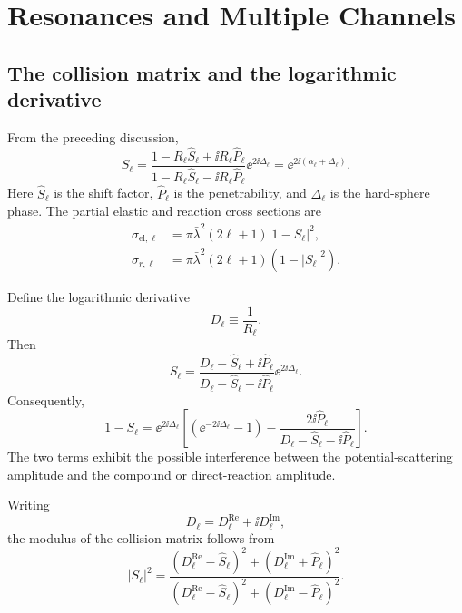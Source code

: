 \chapter{Resonances and Multiple Channels}


\section{The collision matrix and the logarithmic derivative}
From the preceding discussion,
\begin{equation}
  S_\ell
  =\frac{1-R_\ell\widehat S_\ell+\ii R_\ell\widehat P_\ell}
         {1-R_\ell\widehat S_\ell-\ii R_\ell\widehat P_\ell}
   \ee^{2\ii\Delta_\ell}
  =\ee^{2\ii(\alpha_\ell+\Delta_\ell)}.
  \label{eq:res-S-R}
\end{equation}
Here $\widehat S_\ell$ is the shift factor, $\widehat P_\ell$ is the penetrability, and $\Delta_\ell$ is the hard-sphere phase.  The partial elastic and reaction cross sections are
\begin{align}
  \sigma_{\mathrm{el},\ell}
  &=\pi\bar\lambda^2(2\ell+1)|1-S_\ell|^2,
  \label{eq:res-elastic-partial}\\
  \sigma_{r,\ell}
  &=\pi\bar\lambda^2(2\ell+1)(1-|S_\ell|^2).
  \label{eq:res-reaction-partial}
\end{align}

Define the logarithmic derivative
\[
  D_\ell\equiv\frac{1}{R_\ell}.
\]
Then
\begin{equation}
  S_\ell
  =\frac{D_\ell-\widehat S_\ell+\ii\widehat P_\ell}
         {D_\ell-\widehat S_\ell-\ii\widehat P_\ell}
   \ee^{2\ii\Delta_\ell}.
  \label{eq:res-S-D}
\end{equation}
Consequently,
\begin{equation}
  1-S_\ell
  =\ee^{2\ii\Delta_\ell}
  \left[
    \left(\ee^{-2\ii\Delta_\ell}-1\right)
    -\frac{2\ii\widehat P_\ell}
    {D_\ell-\widehat S_\ell-\ii\widehat P_\ell}
  \right].
  \label{eq:res-amplitude-split}
\end{equation}
The two terms exhibit the possible interference between the potential-scattering amplitude and the compound or direct-reaction amplitude.

Writing
\[
  D_\ell=D_\ell^{\mathrm{Re}}+\ii D_\ell^{\mathrm{Im}},
\]
the modulus of the collision matrix follows from
\begin{equation}
  |S_\ell|^2
  =\frac{(D_\ell^{\mathrm{Re}}-\widehat S_\ell)^2
          +(D_\ell^{\mathrm{Im}}+\widehat P_\ell)^2}
         {(D_\ell^{\mathrm{Re}}-\widehat S_\ell)^2
          +(D_\ell^{\mathrm{Im}}-\widehat P_\ell)^2}.
  \label{eq:res-S-modulus}
\end{equation}

